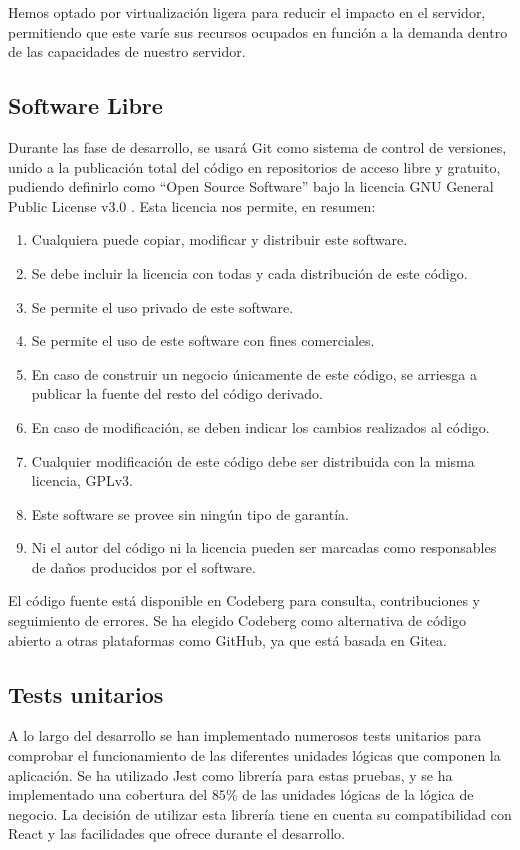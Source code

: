 Hemos optado por virtualización ligera para reducir el impacto en el servidor, permitiendo que este varíe sus recursos ocupados en función a la demanda dentro de las capacidades de nuestro servidor.


\subsection{Software Libre}
\label{tec_hab:foss}

Durante las fase de desarrollo, se usará Git como sistema de control de versiones, unido a la publicación total del código en repositorios de acceso libre y gratuito, pudiendo definirlo como ``Open Source Software'' bajo la licencia GNU General Public License v3.0 \cite{GPLv3}. Esta licencia nos permite, en resumen:

\begin{enumerate}
	\item Cualquiera puede copiar, modificar y distribuir este software.
	\item Se debe incluir la licencia con todas y cada distribución de este código.
	\item Se permite el uso privado de este software.
	\item Se permite el uso de este software con fines comerciales.
	\item En caso de construir un negocio únicamente de este código, se arriesga a publicar la fuente del resto del código derivado.
	\item En caso de modificación, se deben indicar los cambios realizados al código.
	\item Cualquier modificación de este código debe ser distribuida con la misma licencia, GPLv3.
	\item Este software se provee sin ningún tipo de garantía.
	\item Ni el autor del código ni la licencia pueden ser marcadas como responsables de daños producidos por el software.
\end{enumerate}

El código fuente está disponible en Codeberg para consulta, contribuciones y seguimiento de errores. Se ha elegido Codeberg como alternativa de código abierto a otras plataformas como GitHub, ya que está basada en Gitea.


\subsection{Tests unitarios}
\label{tec_hab:tests}

A lo largo del desarrollo se han implementado numerosos tests unitarios para comprobar el funcionamiento de las diferentes unidades lógicas que componen la aplicación. Se ha utilizado Jest como librería para estas pruebas, y se ha implementado una cobertura del $85\%$ de las unidades lógicas de la lógica de negocio. La decisión de utilizar esta librería tiene en cuenta su compatibilidad con React y las facilidades que ofrece durante el desarrollo.
